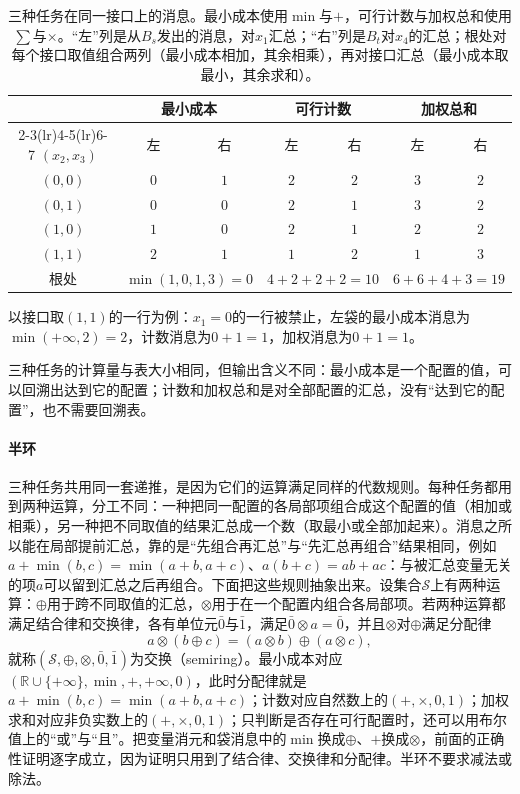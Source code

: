 \begin{table}[!htb]
  \centering
  \caption{三种任务在同一接口上的消息。最小成本使用$\min$与$+$，可行计数与加权总和使用$\sum$与$\times$。“左”列是从$B_s$发出的消息，对$x_1$汇总；“右”列是$B_t$对$x_4$的汇总；根处对每个接口取值组合两列（最小成本相加，其余相乘），再对接口汇总（最小成本取最小，其余求和）。}
  \label{tab:graph-dp-three-aggregations}
  \begin{tabular}{ccccccc}
    \toprule
    & \multicolumn{2}{c}{最小成本} & \multicolumn{2}{c}{可行计数} & \multicolumn{2}{c}{加权总和}\\
    \cmidrule(lr){2-3}\cmidrule(lr){4-5}\cmidrule(lr){6-7}
    $(x_2,x_3)$ & 左 & 右 & 左 & 右 & 左 & 右\\
    \midrule
    $(0,0)$ & $0$ & $1$ & $2$ & $2$ & $3$ & $2$\\
    $(0,1)$ & $0$ & $0$ & $2$ & $1$ & $3$ & $2$\\
    $(1,0)$ & $1$ & $0$ & $2$ & $1$ & $2$ & $2$\\
    $(1,1)$ & $2$ & $1$ & $1$ & $2$ & $1$ & $3$\\
    \midrule
    根处 & \multicolumn{2}{c}{$\min(1,0,1,3)=0$} & \multicolumn{2}{c}{$4+2+2+2=10$} & \multicolumn{2}{c}{$6+6+4+3=19$}\\
    \bottomrule
  \end{tabular}
\end{table}

以接口取$(1,1)$的一行为例：$x_1=0$的一行被禁止，左袋的最小成本消息为$\min(+\infty,2)=2$，计数消息为$0+1=1$，加权消息为$0+1=1$。

三种任务的计算量与表大小相同，但输出含义不同：最小成本是一个配置的值，可以回溯出达到它的配置；计数和加权总和是对全部配置的汇总，没有“达到它的配置”，也不需要回溯表。

\paragraph{半环}
三种任务共用同一套递推，是因为它们的运算满足同样的代数规则。每种任务都用到两种运算，分工不同：一种把同一配置的各局部项组合成这个配置的值（相加或相乘），另一种把不同取值的结果汇总成一个数（取最小或全部加起来）。消息之所以能在局部提前汇总，靠的是“先组合再汇总”与“先汇总再组合”结果相同，例如$a+\min(b,c)=\min(a+b,a+c)$、$a(b+c)=ab+ac$：与被汇总变量无关的项$a$可以留到汇总之后再组合。下面把这些规则抽象出来。设集合$\mathcal S$上有两种运算：$\oplus$用于跨不同取值的汇总，$\otimes$用于在一个配置内组合各局部项。若两种运算都满足结合律和交换律，各有单位元$\bar0$与$\bar1$，满足$\bar0\otimes a=\bar0$，并且$\otimes$对$\oplus$满足分配律
\[
a\otimes(b\oplus c)=(a\otimes b)\oplus(a\otimes c),
\]
就称$(\mathcal S,\allowbreak\oplus,\allowbreak\otimes,\allowbreak\bar0,\allowbreak\bar1)$为交换（semiring）。最小成本对应$(\mathbb R\cup\{+\infty\},\allowbreak\min,\allowbreak+,\allowbreak+\infty,\allowbreak0)$，此时分配律就是$a+\min(b,c)=\min(a+b,a+c)$；计数对应自然数上的$(+,\times,0,1)$；加权求和对应非负实数上的$(+,\times,0,1)$；只判断是否存在可行配置时，还可以用布尔值上的“或”与“且”。把变量消元和袋消息中的$\min$换成$\oplus$、$+$换成$\otimes$，前面的正确性证明逐字成立，因为证明只用到了结合律、交换律和分配律。半环不要求减法或除法。

